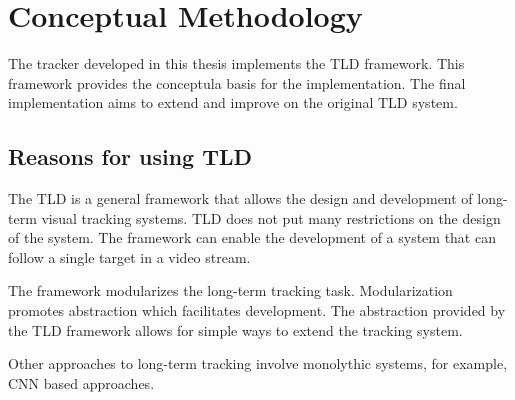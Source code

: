 \section{Conceptual Methodology}
  The tracker developed in this thesis implements the TLD framework.
  This framework provides the conceptula basis for the implementation. 
  The final implementation aims to extend and improve on the original TLD system.

  \subsection{Reasons for using TLD}

    The TLD is a general framework that allows the design and development of long-term visual tracking systems.
    TLD does not put many restrictions on the design of the system.
    The framework can enable the development of a system that can follow a single target in a video stream.

    The framework modularizes the long-term tracking task.
    Modularization promotes abstraction which facilitates development.
    The abstraction provided by the TLD framework allows for simple ways to extend the tracking system.

    Other approaches to long-term tracking involve monolythic systems, for example, CNN based approaches.
